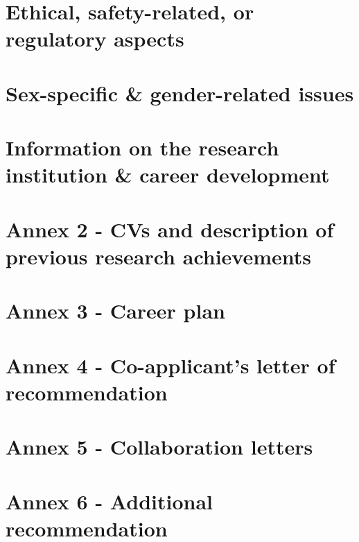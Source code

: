 \documentclass[11pt, a4paper, oneside, article]{memoir}
\begin{document}
\chapter{Ethical, safety-related, or regulatory aspects}


\chapter{Sex-specific \& gender-related issues}


\chapter{Information on the research institution \& career development}
\label{c:info_dev}


\vfill


\printglossary[type=\acronymtype,title={List of abbreviations}]

\newpage

\backmatter
\setcounter{page}{1}
\appendix
\printbibliography[env=bibliography, title=Annex 1 - References]
\chapter{Annex 2 - CVs and description of previous research achievements}
\chapter{Annex 3 - Career plan}
\chapter{Annex 4 - Co-applicant's letter of recommendation}
\chapter{Annex 5 - Collaboration letters}
\chapter{Annex 6 - Additional recommendation}
\end{document}
